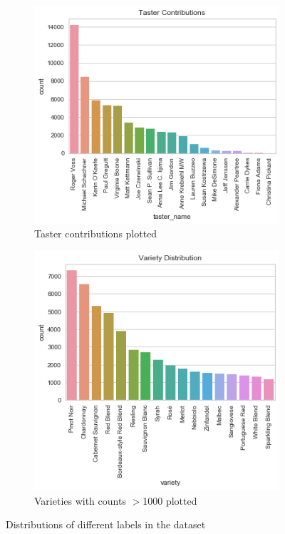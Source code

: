 \documentclass[10pt]{IEEEtran}
\begin{document}
    \begin{figure} %
    \centering
    \begin{subfigure}[t]{0.4\textwidth}
        \centering
        \includegraphics[width=\textwidth]{taster_contribution}
        \caption{Taster contributions plotted}
    \end{subfigure}
    \begin{subfigure}[t]{0.4\textwidth}
        \centering
        \includegraphics[width=\textwidth]{variety_distribution}
        \caption{Varieties with counts $>$1000 plotted}
    \end{subfigure}
    \caption{Distributions of different labels in the dataset}
    \label{data_distributions}
    \end{figure}
\end{document}
